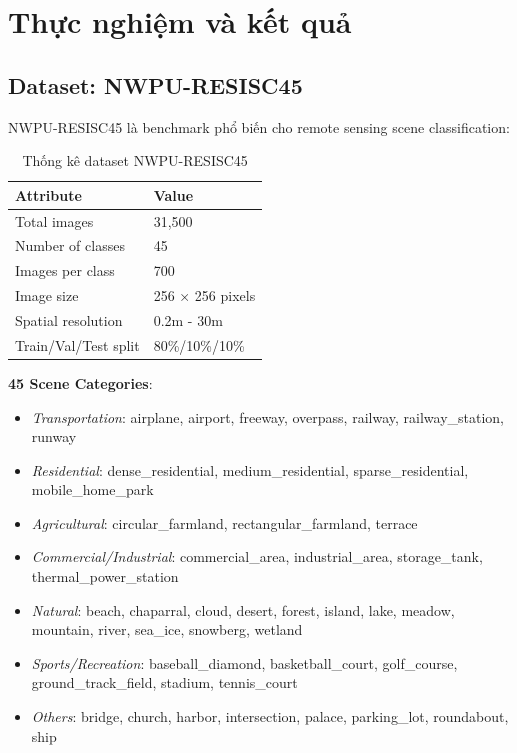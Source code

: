 \documentclass[12pt,a4paper]{article}
\begin{document}
\section{Thực nghiệm và kết quả}

\subsection{Dataset: NWPU-RESISC45}

NWPU-RESISC45 \cite{cheng2017nwpu} là benchmark phổ biến cho remote sensing scene classification:

\begin{table}[H]
\centering
\caption{Thống kê dataset NWPU-RESISC45}
\begin{tabular}{ll}
\toprule
\textbf{Attribute} & \textbf{Value} \\
\midrule
Total images & 31,500 \\
Number of classes & 45 \\
Images per class & 700 \\
Image size & 256 × 256 pixels \\
Spatial resolution & 0.2m - 30m \\
Train/Val/Test split & 80\%/10\%/10\% \\
\bottomrule
\end{tabular}
\end{table}

\textbf{45 Scene Categories}:
\begin{itemize}[noitemsep]
    \item \textit{Transportation}: airplane, airport, freeway, overpass, railway, railway\_station, runway
    \item \textit{Residential}: dense\_residential, medium\_residential, sparse\_residential, mobile\_home\_park
    \item \textit{Agricultural}: circular\_farmland, rectangular\_farmland, terrace
    \item \textit{Commercial/Industrial}: commercial\_area, industrial\_area, storage\_tank, thermal\_power\_station
    \item \textit{Natural}: beach, chaparral, cloud, desert, forest, island, lake, meadow, mountain, river, sea\_ice, snowberg, wetland
    \item \textit{Sports/Recreation}: baseball\_diamond, basketball\_court, golf\_course, ground\_track\_field, stadium, tennis\_court
    \item \textit{Others}: bridge, church, harbor, intersection, palace, parking\_lot, roundabout, ship
\end{itemize}
\end{document}
